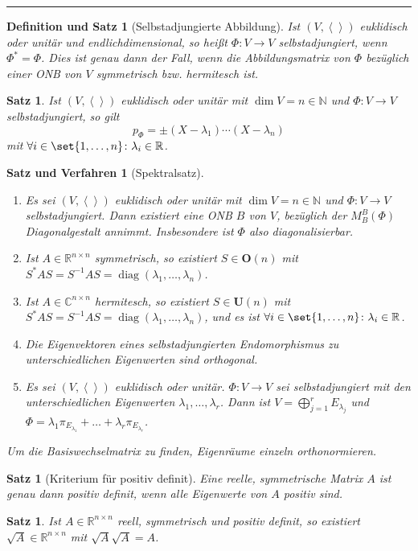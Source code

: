 \documentclass[a4paper]{article}
\newcounter{Sec}
\theoremstyle{marginbreak}
\newtheorem{satz}[definition]{Satz}
\newtheorem{defsatz}[definition]{Definition und Satz}
\newtheorem{satzver}[definition]{Satz und Verfahren}
\DeclareMathOperator{\diag}{diag}
\newcommand{\sep}{%
	\rule{\textwidth}{0.3pt}%
	\stepcounter{Sec}%
	}
\newcommand\scp[1]{\left\langle#1\right\rangle}
\begin{document}
	\sep
	\begin{defsatz}[Selbstadjungierte Abbildung]
		Ist $(V,\scp{})$ euklidisch oder unitär und endlichdimensional, so heißt $\Phi\colon V\to V$ selbstadjungiert,
		wenn $\Phi^*=\Phi$. Dies ist genau dann der Fall, wenn die Abbildungsmatrix von $\Phi$ bezüglich einer
		ONB von $V$ symmetrisch bzw. hermitesch ist.
	\end{defsatz}
	\begin{satz}
		Ist $(V, \scp{})$ euklidisch oder unitär mit $\dim V=n\in\mathbb{N}$ und $\Phi\colon V\to V$ selbstadjungiert,
		so gilt \[p_\Phi=\pm(X-\lambda_1)\cdots(X-\lambda_n)\] mit $\forall i\in\set{1,\ldots,n}\colon\lambda_i\in\mathbb{R}$.
	\end{satz}
	\begin{satzver}[Spektralsatz]
		\begin{enumerate}[label=(\alph*)]
			\item Es sei $(V, \scp{})$ euklidisch oder unitär mit $\dim V=n\in\mathbb{N}$ und $\Phi\colon V\to V$ selbstadjungiert.
				Dann existiert eine ONB $B$ von $V$, bezüglich der $M_B^B(\Phi)$ Diagonalgestalt annimmt. Insbesondere ist $\Phi$
				also diagonalisierbar.
			\item Ist $A\in\mathbb{R}^{n\times n}$ symmetrisch, so existiert
				$S\in\mathbf{O}(n)$ mit $S^*AS=S^{-1}AS = \diag(\lambda_1,\ldots,\lambda_n)$.
			\item Ist $A\in\mathbb{C}^{n\times n}$ hermitesch, so existiert
				$S\in\mathbf{U}(n)$ mit $S^*AS=S^{-1}AS = \diag(\lambda_1,\ldots,\lambda_n)$,
				und es ist $\forall i\in\set{1,\ldots,n}\colon \lambda_i\in\mathbb{R}$.
			\item Die Eigenvektoren eines selbstadjungierten Endomorphismus zu unterschiedlichen
				Eigenwerten sind orthogonal.
			\item Es sei $(V,\scp{})$ euklidisch oder unitär. $\Phi\colon V\to V$ sei selbstadjungiert
				mit den unterschiedlichen Eigenwerten $\lambda_1,\ldots,\lambda_r$. Dann ist
				$V=\bigoplus_{j=1}^rE_{\lambda_j}$ und $\Phi = \lambda_1\pi_{E_{\lambda_1}}+\ldots+\lambda_r\pi_{E_{\lambda_r}}$.
		\end{enumerate}
		Um die Basiswechselmatrix zu finden, Eigenräume einzeln orthonormieren.
	\end{satzver}
	\begin{satz}[Kriterium für positiv definit]
		Eine reelle, symmetrische Matrix $A$ ist genau dann positiv definit, wenn alle
		Eigenwerte von $A$ positiv sind.
	\end{satz}
	\begin{satz}
		Ist $A\in\mathbb{R}^{n\times n}$ reell, symmetrisch und positiv definit,
		so existiert $\sqrt{A}\in\mathbb{R}^{n\times n}$ mit $\sqrt{A}\sqrt{A}=A$.
	\end{satz}
\end{document}
